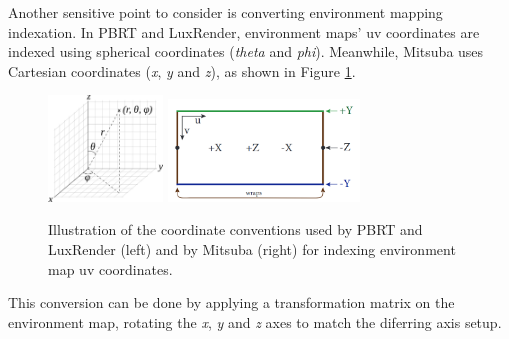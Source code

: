 Another sensitive point to consider is converting environment mapping 
indexation. In PBRT and LuxRender, environment maps' uv coordinates are indexed 
using spherical coordinates (\textit{theta} and \textit{phi}). Meanwhile, 
Mitsuba uses Cartesian coordinates (\textit{x}, \textit{y} and \textit{z}), as 
shown in Figure \ref{fig:mitdocemitter}. 

\begin{figure}[h]
\centering
\includegraphics[width=1.2in]{figs/3_system_architecture/spherical_coordinates.png}
\includegraphics[width=2.0in]{figs/3_system_architecture/mitdocemitter.png}
\caption{Illustration of the coordinate conventions used by PBRT and LuxRender 
(left) and by Mitsuba (right) for indexing environment map uv coordinates.}
\label{fig:mitdocemitter}
\end{figure}

This conversion can be done by applying a transformation matrix on the 
environment map, rotating the \textit{x}, \textit{y} and \textit{z} axes to match the diferring axis setup. 
